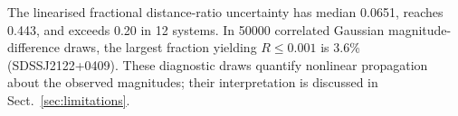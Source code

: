 The linearised fractional distance-ratio uncertainty has median 0.0651, reaches 0.443, and exceeds 0.20 in 12 systems. In 50000 correlated Gaussian magnitude-difference draws, the largest fraction yielding $R\le0.001$ is 3.6\% (SDSSJ2122+0409). These diagnostic draws quantify nonlinear propagation about the observed magnitudes; their interpretation is discussed in Sect.~\ref{sec:limitations}.
